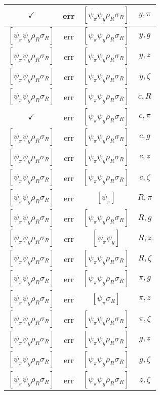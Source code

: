 \documentclass[a4paper,10pt]{article}
\begin{document}
\begin{longtable}{|c|c|c|c|}
\hline
$\checkmark$ & err & $[\psi_\pi \psi_y \rho_R \sigma_R ]$ & ${y},{\pi}$ \\
\hline
$[\psi_\pi \psi_y \rho_R \sigma_R ]$ & err & $[\psi_\pi \psi_y \rho_R \sigma_R ]$ & ${y},{g}$ \\
\hline
$[\psi_\pi \psi_y \rho_R \sigma_R ]$ & err & $[\psi_\pi \psi_y \rho_R \sigma_R ]$ & ${y},{z}$ \\
\hline
$[\psi_\pi \psi_y \rho_R \sigma_R ]$ & err & $[\psi_\pi \psi_y \rho_R \sigma_R ]$ & ${y},{\zeta}$ \\
\hline
$[\psi_\pi \psi_y \rho_R \sigma_R ]$ & err & $[\psi_\pi \psi_y \rho_R \sigma_R ]$ & ${c},{R}$ \\
\hline
$\checkmark$ & err & $[\psi_\pi \psi_y \rho_R \sigma_R ]$ & ${c},{\pi}$ \\
\hline
$[\psi_\pi \psi_y \rho_R \sigma_R ]$ & err & $[\psi_\pi \psi_y \rho_R \sigma_R ]$ & ${c},{g}$ \\
\hline
$[\psi_\pi \psi_y \rho_R \sigma_R ]$ & err & $[\psi_\pi \psi_y \rho_R \sigma_R ]$ & ${c},{z}$ \\
\hline
$[\psi_\pi \psi_y \rho_R \sigma_R ]$ & err & $[\psi_\pi \psi_y \rho_R \sigma_R ]$ & ${c},{\zeta}$ \\
\hline
$[\psi_\pi \psi_y \rho_R \sigma_R ]$ & err & $[\psi_\pi ]$ & ${R},{\pi}$ \\
\hline
$[\psi_\pi \psi_y \rho_R \sigma_R ]$ & err & $[\psi_\pi \psi_y \rho_R \sigma_R ]$ & ${R},{g}$ \\
\hline
$[\psi_\pi \psi_y \rho_R \sigma_R ]$ & err & $[\psi_\pi \psi_y ]$ & ${R},{z}$ \\
\hline
$[\psi_\pi \psi_y \rho_R \sigma_R ]$ & err & $[\psi_\pi \psi_y \rho_R \sigma_R ]$ & ${R},{\zeta}$ \\
\hline
$[\psi_\pi \psi_y \rho_R \sigma_R ]$ & err & $[\psi_\pi \psi_y \rho_R \sigma_R ]$ & ${\pi},{g}$ \\
\hline
$[\psi_\pi \psi_y \rho_R \sigma_R ]$ & err & $[\psi_\pi \sigma_R ]$ & ${\pi},{z}$ \\
\hline
$[\psi_\pi \psi_y \rho_R \sigma_R ]$ & err & $[\psi_\pi \psi_y \rho_R \sigma_R ]$ & ${\pi},{\zeta}$ \\
\hline
$[\psi_\pi \psi_y \rho_R \sigma_R ]$ & err & $[\psi_\pi \psi_y \rho_R \sigma_R ]$ & ${g},{z}$ \\
\hline
$[\psi_\pi \psi_y \rho_R \sigma_R ]$ & err & $[\psi_\pi \psi_y \rho_R \sigma_R ]$ & ${g},{\zeta}$ \\
\hline
$[\psi_\pi \psi_y \rho_R \sigma_R ]$ & err & $[\psi_\pi \psi_y \rho_R \sigma_R ]$ & ${z},{\zeta}$ \\

\end{longtable}
\end{document}
